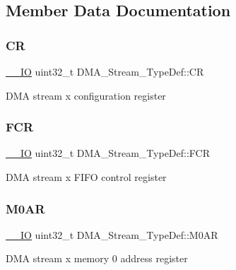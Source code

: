 \subsection{Member Data Documentation}
\mbox{\label{struct_d_m_a___stream___type_def_af893adc5e821b15d813237b2bfe4378b}} 
\subsubsection{\texorpdfstring{CR}{CR}}
{\footnotesize\ttfamily \mbox{\hyperlink{core__sc300_8h_aec43007d9998a0a0e01faede4133d6be}{\+\_\+\+\_\+\+IO}} uint32\+\_\+t D\+M\+A\+\_\+\+Stream\+\_\+\+Type\+Def\+::\+CR}

D\+MA stream x configuration register \mbox{\label{struct_d_m_a___stream___type_def_aad3d78ab35e7af48951be5be53392f9f}} 
\subsubsection{\texorpdfstring{FCR}{FCR}}
{\footnotesize\ttfamily \mbox{\hyperlink{core__sc300_8h_aec43007d9998a0a0e01faede4133d6be}{\+\_\+\+\_\+\+IO}} uint32\+\_\+t D\+M\+A\+\_\+\+Stream\+\_\+\+Type\+Def\+::\+F\+CR}

D\+MA stream x F\+I\+FO control register \mbox{\label{struct_d_m_a___stream___type_def_a965da718db7d0303bff185d367d96fd6}} 
\subsubsection{\texorpdfstring{M0AR}{M0AR}}
{\footnotesize\ttfamily \mbox{\hyperlink{core__sc300_8h_aec43007d9998a0a0e01faede4133d6be}{\+\_\+\+\_\+\+IO}} uint32\+\_\+t D\+M\+A\+\_\+\+Stream\+\_\+\+Type\+Def\+::\+M0\+AR}

D\+MA stream x memory 0 address register \mbox{\label{struct_d_m_a___stream___type_def_a142ca5a1145ba9cf4cfa557655af1c13}} 
